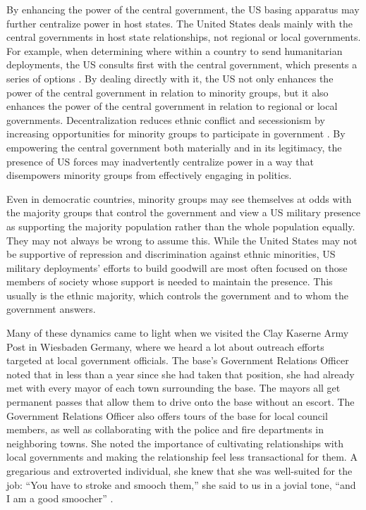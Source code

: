 By enhancing the power of the central government, the US basing apparatus may further centralize power in host states. The United States deals mainly with the central governments in host state relationships, not regional or local governments. For example, when determining where within a country to send humanitarian deployments, the US consults first with the central government, which presents a series of options \cite{Flynn2018}. By dealing directly with it, the US not only enhances the power of the central government in relation to minority groups, but it also enhances the power of the central government in relation to regional or local governments. Decentralization reduces ethnic conflict and secessionism by increasing opportunities for minority groups to participate in government \cite{Brancati2006}. By empowering the central government both materially and in its legitimacy, the presence of US forces may inadvertently centralize power in a way that disempowers minority groups from effectively engaging in politics. 

Even in democratic countries, minority groups may see themselves at odds with the majority groups that control the government and view a US military presence as supporting the majority population rather than the whole population equally. They may not always be wrong to assume this. While the United States may not be supportive of repression and discrimination against ethnic minorities, US military deployments' efforts to build goodwill are most often focused on those members of society whose support is needed to maintain the presence. This usually is the ethnic majority, which controls the government and to whom the government answers.

Many of these dynamics came to light when we visited the Clay Kaserne Army Post in Wiesbaden Germany, where we heard a lot about outreach efforts targeted at local government officials. The base's Government Relations Officer noted that in less than a year since she had taken that position, she had already met with every mayor of each town surrounding the base. The mayors all get permanent passes that allow them to drive onto the base without an escort. The Government Relations Officer also offers tours of the base for local council members, as well as collaborating with the police and fire departments in neighboring towns. She noted the importance of cultivating relationships with local governments and making the relationship feel less transactional for them. A gregarious and extroverted individual, she knew that she was well-suited for the job: ``You have to stroke and smooch them,'' she said to us in a jovial tone, ``and I am a good smoocher'' \cite{kaserneone20190725}.   

